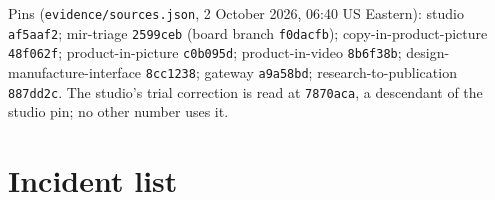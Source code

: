 \documentclass[11pt]{article}
\newcommand{\code}[1]{\texttt{#1}}
\begin{document}
Pins (\code{evidence/sources.json}, 2 October 2026, 06:40 US Eastern): studio
\code{af5aaf2}; mir-triage \code{2599ceb} (board branch \code{f0dacfb});
copy-in-product-picture \code{48f062f}; product-in-picture \code{c0b095d};
product-in-video \code{8b6f38b}; design-manufacture-interface \code{8cc1238}; gateway
\code{a9a58bd}; research-to-publication \code{887dd2c}. The studio's trial correction is
read at \code{7870aca}, a descendant of the studio pin; no other number uses it.

\section{Incident list}\label{app:incidents}

\end{document}
